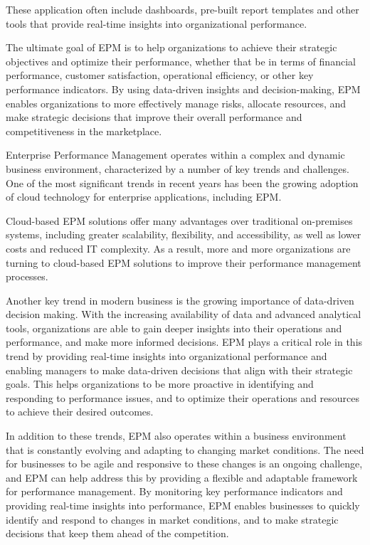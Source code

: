 \documentclass[12pt,a4paper,openright,twoside]{book}
\begin{document}
These application often include dashboards, pre-built report templates and other tools that provide real-time insights into organizational performance.

The ultimate goal of EPM is to help organizations to achieve their strategic objectives and optimize their performance, whether that be in terms of financial performance, customer satisfaction, operational efficiency, or other key performance indicators. 
%
By using data-driven insights and decision-making, EPM enables organizations to more effectively manage risks, allocate resources, and make strategic decisions that improve their overall performance and competitiveness in the marketplace.

Enterprise Performance Management operates within a complex and dynamic business environment, characterized by a number of key trends and challenges. 
%
One of the most significant trends in recent years has been the growing adoption of cloud technology for enterprise applications, including EPM. 

Cloud-based EPM solutions offer many advantages over traditional on-premises systems, including greater scalability, flexibility, and accessibility, as well as lower costs and reduced IT complexity. 
%
As a result, more and more organizations are turning to cloud-based EPM solutions to improve their performance management processes.

Another key trend in modern business is the growing importance of data-driven decision making. 
%
With the increasing availability of data and advanced analytical tools, organizations are able to gain deeper insights into their operations and performance, and make more informed decisions. 
%
EPM plays a critical role in this trend by providing real-time insights into organizational performance and enabling managers to make data-driven decisions that align with their strategic goals. 
%
This helps organizations to be more proactive in identifying and responding to performance issues, and to optimize their operations and resources to achieve their desired outcomes.

In addition to these trends, EPM also operates within a business environment that is constantly evolving and adapting to changing market conditions. 
%
The need for businesses to be agile and responsive to these changes is an ongoing challenge, and EPM can help address this by providing a flexible and adaptable framework for performance management. 
%
By monitoring key performance indicators and providing real-time insights into performance, EPM enables businesses to quickly identify and respond to changes in market conditions, and to make strategic decisions that keep them ahead of the competition.
\end{document}
